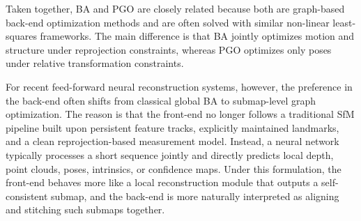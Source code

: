 Taken together, BA and PGO are closely related because both are graph-based back-end optimization methods and are often solved with similar non-linear least-squares frameworks. The main difference is that BA jointly optimizes motion and structure under reprojection constraints, whereas PGO optimizes only poses under relative transformation constraints.

For recent feed-forward neural reconstruction systems, however, the preference in the back-end often shifts from classical global BA to submap-level graph optimization. The reason is that the front-end no longer follows a traditional SfM pipeline built upon persistent feature tracks, explicitly maintained landmarks, and a clean reprojection-based measurement model. Instead, a neural network typically processes a short sequence jointly and directly predicts local depth, point clouds, poses, intrinsics, or confidence maps. Under this formulation, the front-end behaves more like a local reconstruction module that outputs a self-consistent submap, and the back-end is more naturally interpreted as aligning and stitching such submaps together.

